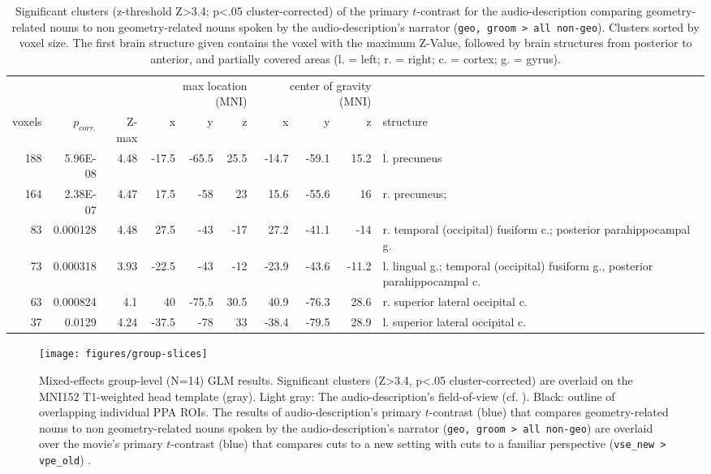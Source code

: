 \documentclass[english]{article}
\begin{document}
\begin{table}[t]
    \caption{Significant clusters (z-threshold Z>3.4; p<.05 cluster-corrected)
        of the primary $t$-contrast for the audio-description comparing
        geometry-related nouns to non geometry-related nouns spoken by the
        audio-description's narrator (\texttt{geo, groom > all non-geo}).
        Clusters sorted by voxel size.
    The first brain structure given contains the voxel with the maximum Z-Value,
followed by brain structures from posterior to anterior, and partially covered
areas (l. = left; r. = right; c. = cortex; g. = gyrus).}
    \label{tab:res-ao-group1}
\begin{tabular}{rrrrrrrrrp{3cm}}
\toprule
& & & \multicolumn{3}{r}{max location (MNI)} & \multicolumn{3}{r}{center of gravity (MNI)} &
\\ \cmidrule{4-6} \cmidrule{7-9}
voxels & $p_{corr.}$ & Z-max & x & y & z  & x & y & z & structure \\
\midrule
188 & 5.96E-08 & 4.48 & -17.5 & -65.5 & 25.5 & -14.7 & -59.1 & 15.2 & l. precuneus \\
164 & 2.38E-07 & 4.47 & 17.5 & -58 & 23 & 15.6 & -55.6 & 16 & r. precuneus; \\
83 & 0.000128 & 4.48 & 27.5 & -43 & -17 & 27.2 & -41.1 & -14 & r. temporal (occipital) fusiform c.; posterior parahippocampal g. \\
73 & 0.000318 & 3.93 & -22.5 & -43 & -12 & -23.9 & -43.6 & -11.2 & l. lingual g.; temporal (occipital) fusiform g., posterior parahippocampal c. \\
63 & 0.000824 & 4.1 & 40 & -75.5 & 30.5 & 40.9 & -76.3 & 28.6 & r. superior lateral occipital c. \\
37 & 0.0129 & 4.24 & -37.5 & -78 & 33 & -38.4 & -79.5 & 28.9 & l. superior lateral occipital c. \\
\bottomrule
\end{tabular}
\end{table}

\begin{figure} \centering
    \texttt{[image: figures/group-slices]}
    \caption{Mixed-effects group-level (N=14) GLM results. Significant clusters
        (Z>3.4, p<.05 cluster-corrected) are overlaid on the MNI152 T1-weighted
        head template (gray).
        Light gray: The audio-description's field-of-view
        (cf. \citep{hanke2014audiomovie}).
        Black: outline of overlapping individual PPA ROIs.
        The results of audio-description's primary $t$-contrast (blue) that
        compares geometry-related nouns to non geometry-related nouns spoken by
        the audio-description's narrator (\texttt{geo, groom > all non-geo})
        are overlaid over the movie's primary $t$-contrast (blue) that compares
        cuts to a new setting with cuts to a familiar perspective
        (\texttt{vse\_new > vpe\_old})
   \citep{sengupta2016extension}.}
    \label{fig:group-slices}
\end{figure}
\end{document}
